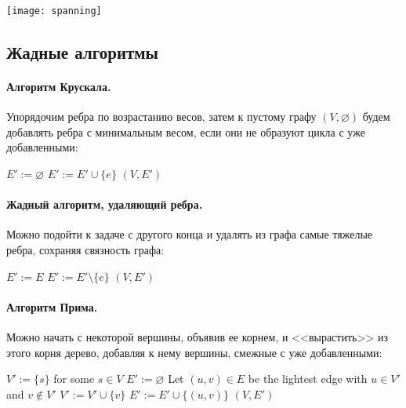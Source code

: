 \documentclass[a4paper,12pt]{article}
\begin{document}
	\begin{example}
		\texttt{[image: spanning]}
	\end{example}

\subsection{Жадные алгоритмы}
\paragraph{Алгоритм Крускала.} Упорядочим ребра по возрастанию весов, затем к пустому графу $(V, \varnothing)$ будем добавлять ребра с минимальным весом, если они не образуют цикла с уже добавленными:

\begin{algorithmic}
	\State $E' := \varnothing$
			\State $E' := E' \cup \{e\}$
		 \EndIf
	\EndFor
	\Return $(V, E')$
\end{algorithmic}

\paragraph{Жадный алгоритм, удаляющий ребра.} Можно подойти к задаче с другого конца и удалять из графа самые тяжелые ребра, сохраняя связность графа:

\begin{algorithmic}
	\State $E' := E$
			\State $E' := E' \setminus \{e\}$
		 \EndIf
	\EndFor
	\Return $(V, E')$
\end{algorithmic}

\paragraph{Алгоритм Прима.} Можно начать с некоторой вершины, объявив ее корнем, и <<вырастить>> из этого корня дерево, добавляя к нему вершины, смежные с уже добавленными:

\begin{algorithmic}
	\State $V' := \{s\}$ for some $s \in V$
	\State $E' := \varnothing$
		\State Let $(u, v) \in E$ be the lightest edge with $u \in V'$ and $v \not\in V'$
		\State $V' := V' \cup \{v\}$
		\State $E' := E' \cup \{(u, v)\}$
	\EndWhile
	\Return $(V, E')$
\end{algorithmic}
\end{document}
